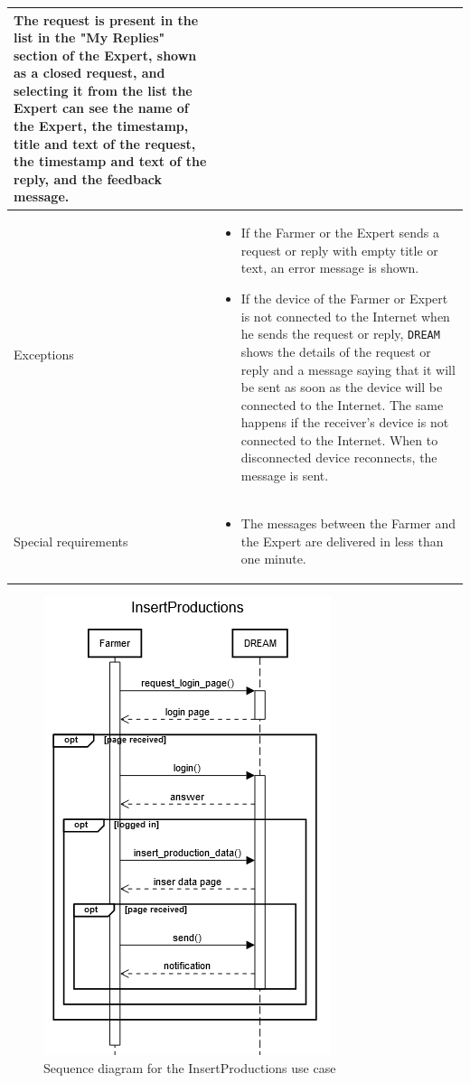 \documentclass{article}
\begin{document}
\begin{longtable}{|p{3.5cm}|m{8cm}|}
The request is present in the list in the "My Replies" section of the Expert, shown as a closed request, and selecting it from the list the Expert can see the name of the Expert, the timestamp, title and text of the request, the timestamp and text of the reply, and the feedback message.\\
 \hline
 Exceptions & \begin{itemize}
     \item If the Farmer or the Expert sends a request or reply with empty title or text, an error message is shown.
    \item If the device of the Farmer or Expert is not connected to the Internet when he sends the request or reply, \verb|DREAM| shows the details of the request or reply and a message saying that it will be sent as soon as the device will be connected to the Internet. The same happens if the receiver's device is not connected to the Internet. When to disconnected device reconnects, the message is sent.
 \end{itemize}\\
 \hline
 Special requirements & \begin{itemize}
     \item The messages between the Farmer and the Expert are delivered in less than one minute.
 \end{itemize}\\
 \hline
\end{longtable}

\begin{figure}[H]
    \centering
    \includegraphics[scale=0.75]{sequence_diagrams/InsertProductions}
    \caption{Sequence diagram for the InsertProductions use case}
\end{figure}
\end{document}
